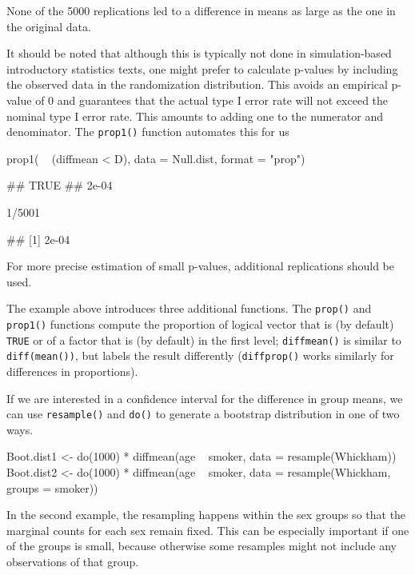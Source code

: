 \noindent
None of the 5000 replications led to a difference in means as large as
the one in the original data.

It should be noted that although this is typically not done in
simulation-based introductory statistics texts, one might prefer to
calculate p-values by including the observed data in the randomization
distribution. This avoids an empirical p-value of 0 and guarantees that
the actual type I error rate will not exceed the nominal type I error
rate. This amounts to adding one to the numerator and denominator. The
\texttt{prop1()} function automates this for us

\begin{Schunk}
\begin{Sinput}
prop1( ~ (diffmean < D), data = Null.dist, format = "prop")
\end{Sinput}
\begin{Soutput}
##  TRUE 
## 2e-04
\end{Soutput}
\begin{Sinput}
1/5001
\end{Sinput}
\begin{Soutput}
## [1] 2e-04
\end{Soutput}
\end{Schunk}

\noindent
For more precise estimation of small p-values, additional replications
should be used.

The example above introduces three additional  functions.
The \texttt{prop()} and \texttt{prop1()} functions compute the
proportion of logical vector that is (by default) \texttt{TRUE} or of a
factor that is (by default) in the first level; \texttt{diffmean()} is
similar to \texttt{diff(mean())}, but labels the result differently
(\texttt{diffprop()} works similarly for differences in proportions).

If we are interested in a confidence interval for the difference in
group means, we can use \texttt{resample()} and \texttt{do()} to
generate a bootstrap distribution in one of two ways.

\begin{Schunk}
\begin{Sinput}
Boot.dist1 <- do(1000) * diffmean(age ~ smoker, data = resample(Whickham))
Boot.dist2 <- do(1000) * diffmean(age ~ smoker, data = resample(Whickham, groups = smoker))
\end{Sinput}
\end{Schunk}

\noindent
In the second example, the resampling happens within the sex groups so
that the marginal counts for each sex remain fixed. This can be
especially important if one of the groups is small, because otherwise
some resamples might not include any observations of that group.

